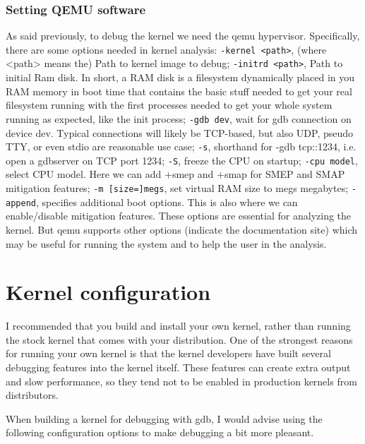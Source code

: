 \documentclass{masterthesis}
\begin{document}
\subsection{Setting QEMU software}
\label{subsect:QEMU}
As said previously, to debug the kernel we need the qemu hypervisor. Specifically, there are some options needed in kernel analysis:
\lstinline{-kernel <path>}, (where <path> means the) Path to kernel image to debug;
\lstinline{-initrd <path>}, Path to initial Ram disk. In short, a RAM disk is a filesystem dynamically placed in you RAM memory in boot time that contains the basic stuff needed to get your real filesystem running with the first processes needed to get your whole system running as expected, like the init process;
\lstinline{-gdb dev}, wait for gdb connection on device dev. Typical connections will likely be TCP-based, but also UDP, pseudo TTY, or even stdio are reasonable use case;
\lstinline{-s}, shorthand for -gdb tcp::1234, i.e. open a gdbserver on TCP port 1234;
\lstinline{-S}, freeze the CPU on startup;
\lstinline{-cpu model}, select CPU model. Here we can add +smep and +smap for SMEP and SMAP mitigation features;
\lstinline{-m [size=]megs}, set virtual RAM size to megs megabytes;
\lstinline{-append}, specifies additional boot options. This is also where we can enable/disable mitigation features.
These options are essential for analyzing the kernel. But qemu supports other options (indicate the documentation site) which may be useful for running the system and to help the user in the analysis.


\chapter{Kernel configuration}
\label{ch:kernel-configuration}

I recommended that you build and install your own kernel, rather than running the stock kernel that comes with your distribution. One of the strongest reasons for running your own kernel is that the kernel developers have built several debugging features into the kernel itself. These features can create extra output and slow performance, so they tend not to be enabled in production kernels from distributors.

When building a kernel for debugging with gdb, I would advise using the following configuration options to make debugging a bit more pleasant.
\end{document}
